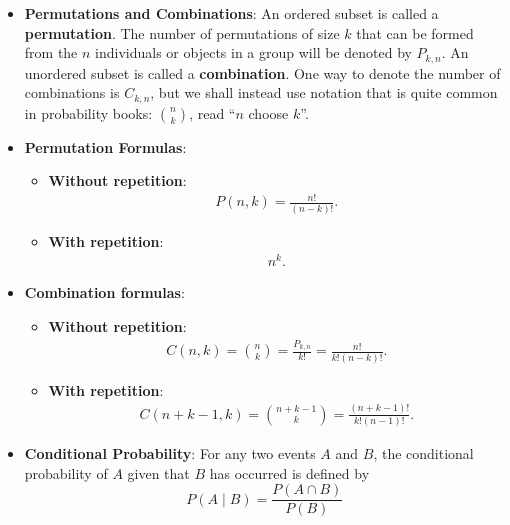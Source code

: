 \documentclass{report}
\begin{document}
\begin{itemize}
        \item \textbf{Permutations and Combinations}:
            An ordered subset is called a \textbf{permutation}. The number of permutations of
            size \( k \) that can be formed from the \( n \) individuals or objects in a group will be
            denoted by \( P_{k,n} \). An unordered subset is called a \textbf{combination}. One way to
            denote the number of combinations is \( C_{k,n} \), but we shall instead use notation
            that is quite common in probability books: \(\binom{n}{k}\), read “\( n \) choose \( k \)”.
        \item \textbf{Permutation Formulas}:
            \begin{itemize}
                \item \textbf{Without repetition}:
                    \begin{align*}
                        P(n, k) = \frac{n!}{(n-k)!}
                    .\end{align*}
                \item \textbf{With repetition}:
                    \begin{align*}
                        n^{k}
                    .\end{align*}
            \end{itemize}
        \item \textbf{Combination formulas}:
            \begin{itemize}
                \item \textbf{Without repetition}:
                    \begin{align*}
                        C(n, k) = \binom{n}{k} = \frac{P_{k,n}}{k!} =  \frac{n!}{k!(n-k)!}
                    .\end{align*}
                \item \textbf{With repetition}:
                    \begin{align*}
                        C(n+k-1, k) = \binom{n+k-1}{k} = \frac{(n+k-1)!}{k!(n-1)!}
                    .\end{align*}
            \end{itemize}
        \item \textbf{Conditional Probability}:
            For any two events \( A \) and \( B \), the conditional probability of \( A \)
            given that \( B \) has occurred is defined by
            \[
                P(A \mid B) = \frac{P(A \cap B)}{P(B)}
            \]

\end{itemize}
\end{document}
